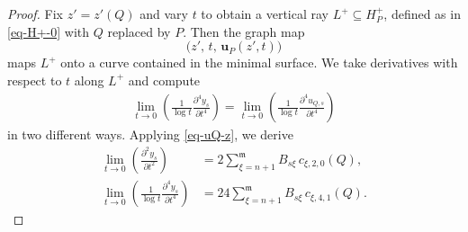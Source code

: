 \documentclass[11pt,reqno]{amsart}
\newcommand{\fm}{\mathfrak{m}}
\theoremstyle{definition}
\numberwithin{equation}{section}
\begin{document}
\begin{proof}
Fix $z' = z'(Q)$ and vary $t$ to obtain a vertical ray $L^+ \subseteq H_P^+$, defined as in \eqref{eq-H+-0} with $Q$ replaced by $P$. Then the graph map
\begin{equation}
    \bigl(z',\, t,\, \mathbf{u}_P(z', t)\bigr)
\end{equation}
maps $L^+$ onto a curve contained in the minimal surface. We take derivatives with respect to $t$ along $L^+$ and compute
\begin{align}
    \lim_{t\rightarrow 0}\left(\frac{1}{\log t} \frac{\partial^4 y_s}{\partial t^4} \right)
    = \lim_{t\rightarrow 0}\left(\frac{1}{\log t} \frac{\partial^4 u_{Q,s}}{\partial t^4} \right)
\end{align}
in two different ways. Applying \eqref{eq-uQ-z}, we derive
\begin{align}
    \lim_{t\rightarrow 0}\left(\frac{\partial^2 y_s}{\partial t^2} \right)
    &= 2 \sum_{\xi=n+1}^\fm B_{s\xi} \, c_{\xi,2,0}(Q), \label{eq-c2-trans}\\[4pt]
    \lim_{t\rightarrow 0}\left(\frac{1}{\log t} \frac{\partial^4 y_s}{\partial t^4} \right)
    &= 24 \sum_{\xi=n+1}^\fm B_{s\xi} \, c_{\xi,4,1}(Q). \label{eq-c41-trans}
\end{align}


\end{proof}
\end{document}
